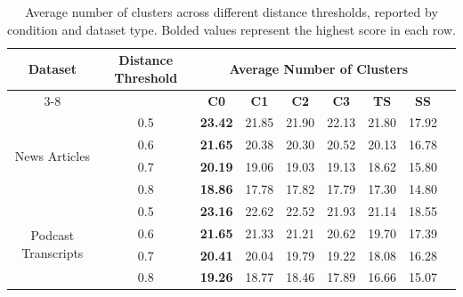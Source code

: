 \begin{table}
\centering
\caption{Average number of clusters across different distance thresholds, reported by condition and dataset type. Bolded values represent the highest score in each row.}
\begin{tabular}{c c ccccccc}
    \toprule
\multirow{2}{*}{\textbf{Dataset}} & \multirow{2}{*}{\textbf{Distance Threshold}} & \multicolumn{6}{c}{\textbf{Average Number of Clusters}} \\ 
    \cmidrule(lr){3-8}
 &  & \textbf{C0} & \textbf{C1} & \textbf{C2} & \textbf{C3} & \textbf{TS} & \textbf{SS} \\ 
    \midrule
\multirow{4}{*}{News Articles} & 0.5 & \textbf{23.42} & 21.85 & 21.90 & 22.13 & 21.80 & 17.92 \\
                          & 0.6 & \textbf{21.65} & 20.38 & 20.30 & 20.52 & 20.13 & 16.78 \\
                          & 0.7 & \textbf{20.19} & 19.06 & 19.03 & 19.13 & 18.62 & 15.80 \\
                          & 0.8 & \textbf{18.86} & 17.78 & 17.82 & 17.79 & 17.30 & 14.80 \\
\midrule
\multirow{4}{*}{Podcast Transcripts}  & 0.5 & \textbf{23.16} & 22.62 & 22.52 & 21.93 & 21.14 & 18.55 \\
                          & 0.6 & \textbf{21.65} & 21.33 & 21.21 & 20.62 & 19.70 & 17.39 \\
                          & 0.7 & \textbf{20.41} & 20.04 & 19.79 & 19.22 & 18.08 & 16.28 \\
                          & 0.8 & \textbf{19.26} & 18.77 & 18.46 & 17.89 & 16.66 & 15.07 \\
    \bottomrule
\end{tabular}
\label{tab:claim_div}
\end{table}